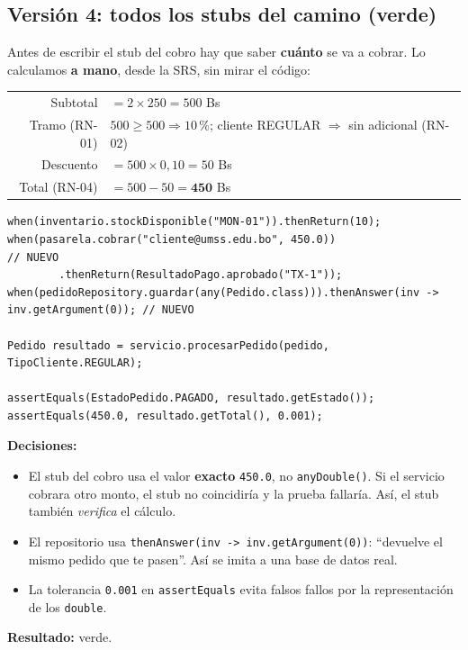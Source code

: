 \documentclass[11pt,a4paper,oneside]{report}
\newcommand{\code}[1]{\texttt{#1}}
\begin{document}
\subsection{Versión 4: todos los stubs del camino (verde)}
Antes de escribir el stub del cobro hay que saber \textbf{cuánto} se va a cobrar. Lo calculamos \textbf{a mano}, desde la SRS, sin mirar el código:

\begin{center}
\begin{tabular}{rl}
Subtotal & $= 2 \times 250 = 500$ Bs\\
Tramo (RN-01) & $500 \geq 500 \Rightarrow 10$\,\%; cliente REGULAR $\Rightarrow$ sin adicional (RN-02)\\
Descuento & $= 500 \times 0{,}10 = 50$ Bs\\
Total (RN-04) & $= 500 - 50 = \mathbf{450}$ Bs\\
\end{tabular}
\end{center}

\begin{lstlisting}[caption={\code{Paso4\_VerdeTest}}]
when(inventario.stockDisponible("MON-01")).thenReturn(10);
when(pasarela.cobrar("cliente@umss.edu.bo", 450.0))                          // NUEVO
        .thenReturn(ResultadoPago.aprobado("TX-1"));
when(pedidoRepository.guardar(any(Pedido.class))).thenAnswer(inv -> inv.getArgument(0)); // NUEVO

Pedido resultado = servicio.procesarPedido(pedido, TipoCliente.REGULAR);

assertEquals(EstadoPedido.PAGADO, resultado.getEstado());
assertEquals(450.0, resultado.getTotal(), 0.001);
\end{lstlisting}
\textbf{Decisiones:}
\begin{itemize}
  \item El stub del cobro usa el valor \textbf{exacto} \code{450.0}, no \code{anyDouble()}. Si el servicio cobrara otro monto, el stub no coincidiría y la prueba fallaría. Así, el stub también \emph{verifica} el cálculo.
  \item El repositorio usa \code{thenAnswer(inv -> inv.getArgument(0))}: ``devuelve el mismo pedido que te pasen''. Así se imita a una base de datos real.
  \item La tolerancia \code{0.001} en \code{assertEquals} evita falsos fallos por la representación de los \code{double}.
\end{itemize}
\textbf{Resultado:} \textcolor{verde}{verde}.
\end{document}
